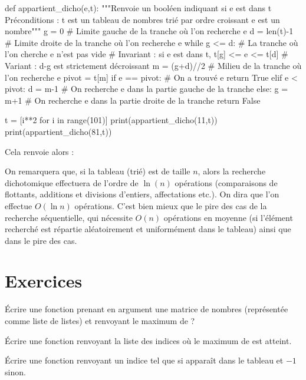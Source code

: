 \begin{pyblock}
def appartient_dicho(e,t):
    """Renvoie un booléen indiquant si e est dans t
       Préconditions : t est un tableau de nombres trié par ordre croissant
                       e est un nombre"""
    g = 0 # Limite gauche de la tranche où l'on recherche e
    d = len(t)-1 # Limite droite de la tranche où l'on recherche e
    while g <= d: # La tranche où l'on cherche e n'est pas vide
        # Invariant : si e est dans t, t[g] <= e <= t[d]
        # Variant : d-g est strictement décroissant
        m = (g+d)//2 # Milieu de la tranche où l'on recherche e
        pivot = t[m] 
        if e == pivot: # On a trouvé e
            return True
        elif e < pivot: 
            d = m-1 # On recherche e dans la partie gauche de la tranche
        else:
            g = m+1 # On recherche e dans la partie droite de la tranche
    return False
    
t = [i**2 for i in range(101)]
print(appartient_dicho(11,t))
print(appartient_dicho(81,t))
\end{pyblock}
Cela renvoie alors :
\begin{quote}
  \printpythontex[verb]
\end{quote}
On remarquera que, si la tableau  (trié) est de taille $n$, alors la recherche dichotomique effectuera de l'ordre de $\ln(n)$ opérations (comparaisons de flottants, additions et divisions d'entiers, affectations etc.).
On dira que l'on effectue $O(\ln n)$ opérations.
C'est bien mieux que le pire des cas de la recherche séquentielle, qui nécessite $O(n)$ opérations \og en moyenne \fg{} (si l'élément recherché est répartie aléatoirement et uniformément dans le tableau) ainsi que dans le pire des cas.
\section{Exercices}

    Écrire une fonction  prenant en argument une matrice de nombres  (représentée comme liste de listes) et renvoyant le maximum de ?


  \'Ecrire une fonction  renvoyant la liste des indices où le maximum de  est atteint.


  \'Ecrire une fonction  renvoyant un indice
 tel que  si  apparaît dans le tableau  et $-1$ sinon.

